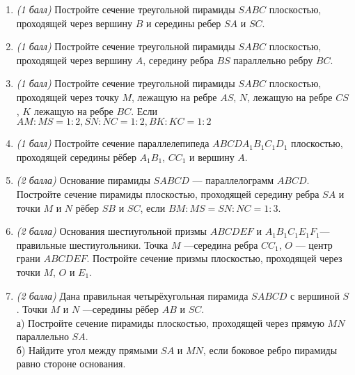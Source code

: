 \documentclass[12pt, a4paper]{article}
\begin{document}
	
	\begin{enumerate}
		\item \textit{(1 балл)} Постройте сечение треугольной пирамиды $SABC$ плоскостью, проходящей через вершину $B$ и середины ребер $SA$ и $SC$.
		\item \textit{(1 балл)} Постройте сечение треугольной пирамиды $SABC$ плоскостью, проходящей через вершину $A$, середину ребра $BS$ параллельно ребру $BC$.
		\item \textit{(1 балл)} Постройте сечение треугольной пирамиды $SABC$ плоскостью, проходящей через точку $M$, лежащую на ребре $AS$, $N$, лежащую на ребре $CS$, $K$ лежащую на ребре $BC$. Если $AM:MS=1:2, SN:NC=1:2, BK:KC=1:2$
		\item \textit{(1 балл)} Постройте сечение параллелепипеда $ABCDA_1B_1C_1D_1$ плоскостью, проходящей середины рёбер $A_1B_1$, $CC_1$ и вершину $A$.
		\item \textit{(2 балла)} Основание пирамиды $SABCD$ — параллелограмм $ABCD$. Постройте сечение пирамиды плоскостью, проходящей середину ребра $SA$ и точки $M$ и $N$ рёбер $SB$ и $SC$, если $BM:MS=SN:NC =1:3$.
		\item \textit{(2 балла)} Основания шестиугольной призмы $ABCDEF$ и $A_1B_1C_1E_1F_1$—правильные шестиугольники. Точка $M$ —середина ребра $CC_1$, $O$ —
		центр грани $ABCDEF$. Постройте сечение призмы плоскостью, проходящей через точки $M$, $O$ и $E_1$.
		\item \textit{(2 балла)} Дана правильная четырёхугольная пирамида $SABCD$ с вершиной $S$. Точки $M$ и $N$ —середины рёбер $AB$ и $SC$.\\
		а) Постройте сечение пирамиды плоскостью, проходящей через прямую $MN$ параллельно $SA$.\\
		б) Найдите угол между прямыми $SA$ и $MN$, если боковое ребро пирамиды равно стороне основания.
	\end{enumerate}
\end{document}
